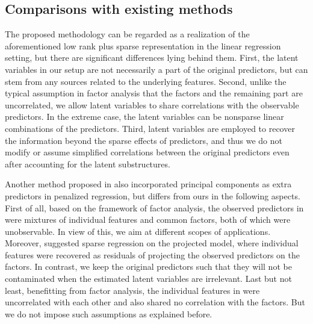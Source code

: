 \documentclass{statsoc}
\newcommand{\bF}{\mbox{\bf F}}
\begin{document}



\subsection{Comparisons with existing methods}

The proposed methodology can be regarded as a realization of the aforementioned low rank plus sparse representation \citep{Fan2013} in the linear regression setting, but there are significant differences lying behind them. First, the latent variables in our setup are not necessarily a part of the original predictors, but can stem from any sources related to the underlying features. Second, unlike the typical assumption in factor analysis that the factors and the remaining part are uncorrelated, we allow latent variables to share correlations with the observable predictors. In the extreme case, the latent variables can be nonsparse linear combinations of the predictors. Third, latent variables are employed to recover the information beyond the sparse effects of predictors, and thus we do not modify or assume simplified correlations between the original predictors even after accounting for the latent substructures.

Another method proposed in \cite{Kneip2011} also incorporated principal components as extra predictors in penalized regression, but differs from ours in the following aspects. First of all, based on the framework of factor analysis, the observed predictors in \cite{Kneip2011} were mixtures of individual features and common factors, both of which were unobservable. In view of this, we aim at different scopes of applications. Moreover, \cite{Kneip2011} suggested sparse regression on the projected model, where individual features were recovered as residuals of projecting the observed predictors on the factors. In contrast, we keep the original predictors such that they will not be contaminated when the estimated latent variables are irrelevant. Last but not least, benefitting from factor analysis, the individual features in \cite{Kneip2011} were uncorrelated with each other and also shared no correlation with the factors. But we do not impose such assumptions as explained before.

\end{document}
